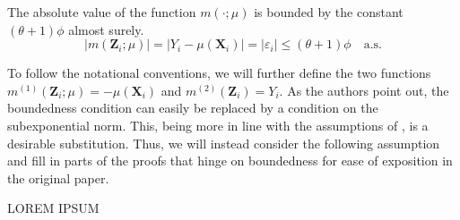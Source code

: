 \documentclass[letterpaper,10pt]{article}
\numberwithin{equation}{section}
\numberwithin{theorem}{section}
\theoremstyle{definition}
\newcommand{\1}{\mathbb{1}}
\begin{document}
\vspace{0.5cm}
\begin{assumption}
	The absolute value of the function $m(\cdot; \mu)$ is bounded by the constant $(\theta+1) \phi$ almost surely.
	\begin{equation}
		|m(\mathbf{Z}_i ; \mu)|
		= |Y_i - \mu(\mathbf{X}_i)|
		= |\varepsilon_i|
		\leq (\theta+1) \phi
		\quad \text{a.s.}
	\end{equation}
\end{assumption}
To follow the notational conventions, we will further define the two functions $m^{(1)}(\mathbf{Z}_i; \mu) = - \mu(\mathbf{X}_i)$ and $m^{(2)}(\mathbf{Z}_i) = Y_i$.
As the authors point out, the boundedness condition can easily be replaced by a condition on the subexponential norm.
This, being more in line with the assumptions of \citet{demirkaya_optimal_2024}, is a desirable substitution.
Thus, we will instead consider the following assumption and fill in parts of the proofs that hinge on boundedness for ease of exposition in the original paper.

\vspace{0.5cm}
\begin{assumption}

\end{assumption}

{\color{red} LOREM IPSUM}



\end{document}
